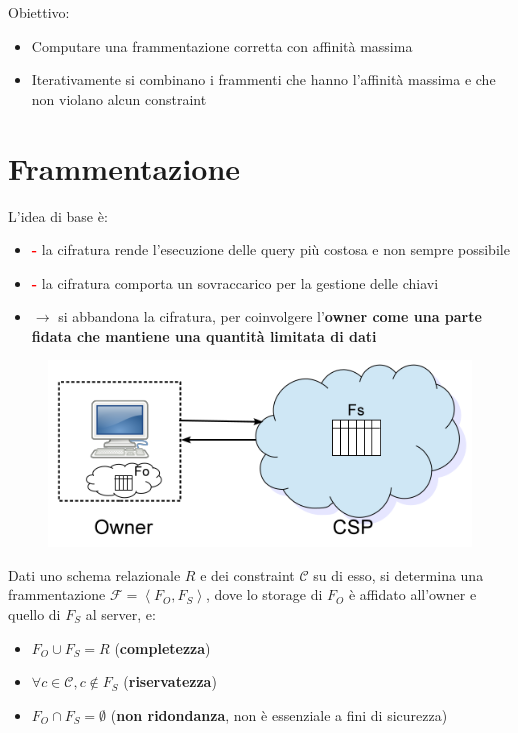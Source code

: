 \documentclass{report}
\begin{document}
Obiettivo: 
\begin{itemize}
    \item Computare una frammentazione corretta con affinità massima 
    \item Iterativamente si combinano i frammenti che hanno l'affinità massima e che non violano alcun constraint
\end{itemize}

\chapter{Frammentazione}
L'idea di base è:
\begin{itemize}
    \item \textcolor{red}{\textbf{-}} la cifratura rende l'esecuzione delle query più costosa e non sempre possibile 
    \item \textcolor{red}{\textbf{-}} la cifratura comporta un sovraccarico per la gestione delle chiavi
    \item $\rightarrow$ si abbandona la cifratura, per coinvolgere l'\textbf{owner come una parte fidata che mantiene una quantità limitata di dati}
\end{itemize}

\begin{figure}[ht]
    \centering
    \includegraphics[width=0.7\linewidth]{images/fragmentation/intro.png}
\end{figure}

Dati uno schema relazionale $R$ e dei constraint $\mathcal{C}$ su di esso, si 
determina una frammentazione $\mathcal{F} = \left\langle F_O, F_S \right\rangle$, dove lo storage di
$F_O$ è affidato all'owner e quello di $F_S$ al server, e:
\begin{itemize}
    \item $F_O \cup F_S = R$ (\textbf{completezza})
    \item $\forall c \in \mathcal{C}, c \notin F_S$ (\textbf{riservatezza})
    \item $F_O \cap F_S = \emptyset$ (\textbf{non ridondanza}, non è essenziale a fini di sicurezza)
\end{itemize}
\end{document}
